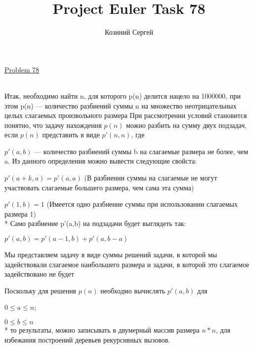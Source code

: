 \documentclass[11pt,a4paper]{article}
\title{Project Euler Task 78}
\author{Козиний Сергей}
\begin{document}
    
\maketitle
\href{''https://projecteuler.net/problem=78''}{Problem 78}

\\

Итак, необходимо найти n, для которого p(n) делится нацело на 1000000, при этом p(n) --- количество разбиений суммы n на множество неотрицательных целых слагаемых произвольного размера
При  рассмотрении условий становится понятно, что задачу нахождения $p(n)$ можно разбить на сумму двух подзадач, если $p(n)$ представить в виде $p'(n,n)$, где

$p'(a,b)$ --- количество разбиений суммы  b на слагаемые размера не более, чем a. Из данного определения можно вывести следующие свойста:

$p'(a+k,a) = p'(a,a)$ (В разбиении суммы на слагаемые не могут участвовать слагаемые большего размера, чем сама эта сумма)

$p'(1,b) = 1$ (Имеется одно разбиение суммы при использовании слагаемых размера 1)\\*
Само разбиение p'(a,b) на подзадачи будет выглядеть так:

$p'(a,b) = p'(a-1,b) + p'(a,b-a)$

Мы представляем задачу в виде суммы решений задачи, в которой мы задействовали слагаемое наибольшего размера и задачи, в которой это слагаемое задействовано не будет

Поскольку для решения $p(n) $ необходмо вычислять  $p'(a,b)$ для

$0 \leq a \leq n$;

$0 \leq b \leq n$
\\*
то результаты, можно записывать в двумерный массив размера $n*n$, для избежания построений деревьев рекурсивных вызовов.
\end{document}
